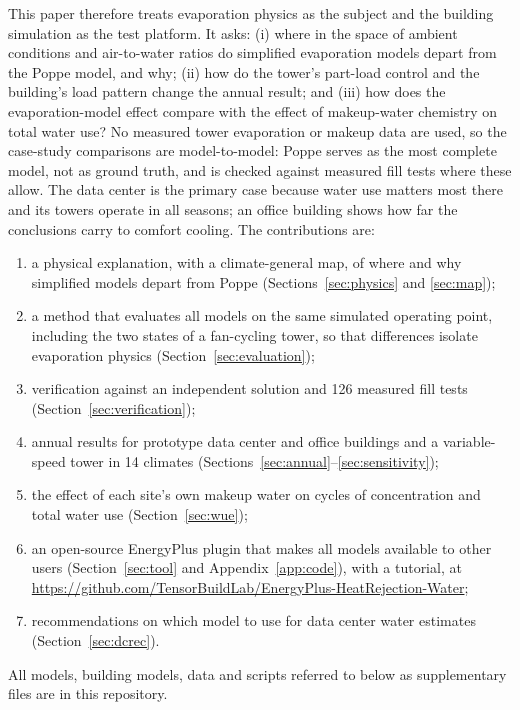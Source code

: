 \documentclass[preprint,12pt]{elsarticle}
\begin{document}
This paper therefore treats evaporation physics as the subject and the building simulation as the test platform. It
asks: (i) where in the space of ambient conditions and air-to-water ratios do simplified evaporation models depart from
the Poppe model, and why; (ii) how do the tower's part-load control and the building's load pattern change the annual
result; and (iii) how does the evaporation-model effect compare with the effect of makeup-water chemistry on total
water use? No measured tower evaporation or makeup data are used, so the case-study comparisons are model-to-model:
Poppe serves as the most complete model, not as ground truth, and is checked against measured fill tests where these
allow. The data center is the primary case because water use matters most there and its towers operate in all seasons;
an office building shows how far the conclusions carry to comfort cooling. The contributions are:
\begin{enumerate}
\item a physical explanation, with a climate-general map, of where and why simplified models depart from Poppe
(Sections~\ref{sec:physics} and \ref{sec:map});
\item a method that evaluates all models on the same simulated operating point, including the two states of a
fan-cycling tower, so that differences isolate evaporation physics (Section~\ref{sec:evaluation});
\item verification against an independent solution and 126 measured fill tests (Section~\ref{sec:verification});
\item annual results for prototype data center and office buildings and a variable-speed tower in 14 climates
(Sections~\ref{sec:annual}--\ref{sec:sensitivity});
\item the effect of each site's own makeup water on cycles of concentration and total water use (Section~\ref{sec:wue});
\item an open-source EnergyPlus plugin that makes all models available to other users (Section~\ref{sec:tool} and
Appendix~\ref{app:code}), with a tutorial, at \url{https://github.com/TensorBuildLab/EnergyPlus-HeatRejection-Water};
\item recommendations on which model to use for data center water estimates (Section~\ref{sec:dcrec}).
\end{enumerate}
All models, building models, data and scripts referred to below as supplementary files are in this repository.

\end{document}
